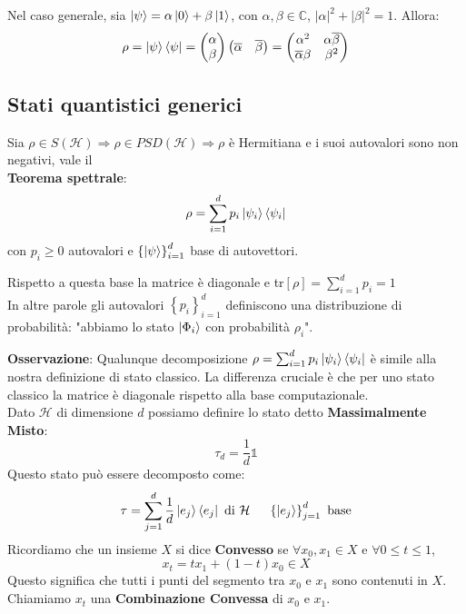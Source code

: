 \documentclass{report}
\begin{document}
Nel caso generale, sia $\ket{\psi}= \alpha\ket{0}+\beta\ket{1}$, con $\alpha, \beta \in \mathbb{C}$, $|\alpha|^2 + |\beta|^2=1$. Allora:
$$\rho= \ket{\psi}\bra{\psi}= 
\begin{pmatrix}
    \alpha \\
    \beta
\end{pmatrix}
\begin{pmatrix}
    \overline{\alpha} & \overline{\beta}
\end{pmatrix}
= \begin{pmatrix}
    \alpha^2 & \alpha\overline{\beta}\\
    \overline{\alpha}\beta & \beta^2
\end{pmatrix}
$$

\subsection{Stati quantistici generici}
Sia $\rho \in S(\mathcal{H}) \Rightarrow \rho \in \textit{PSD}(\mathcal{H}) \Rightarrow \rho$ è Hermitiana e i suoi autovalori sono non negativi, vale il \\\textbf{Teorema spettrale}:
$$\rho = \sum^d_{i=1}p_i \ket{\psi_i}\bra{\psi_i}$$
con $p_i\ge 0$ autovalori e $\left\{ \ket{\psi} \right\}^d_{i=1}$ base di autovettori.

Rispetto a questa base la matrice è diagonale e tr$[\rho] = \sum^d_{i=1} p_i = 1$
\\In altre parole gli autovalori $\left\{  p_i \right\}^d_{i=1}$ definiscono una distribuzione di probabilità: "abbiamo lo stato $\ket{ \Phi_i}$ con probabilità $\rho_i$".

\textbf{Osservazione}: Qualunque decomposizione $\rho = \sum^d_{i=1} p_i \ket{\psi_i}\bra{\psi_i}$ è simile alla nostra definizione di stato classico. La differenza cruciale è che per uno stato classico la matrice è diagonale rispetto alla base computazionale.
\medskip
\\Dato $\mathcal{H}$ di dimensione $d$ possiamo definire lo stato detto \textbf{Massimalmente Misto}: $$\tau_d=\frac{1}{d}\mathbb{1}$$
Questo stato può essere decomposto come:
$$\tau = \sum^d_{j=1} \frac{1}{d} \ket{e_j}\bra{e_j} \text{ di } \mathcal{H} \hspace{0.5cm} \left\{ \ket{e_j} \right\}^d_{j=1} \text{ base}$$
Ricordiamo che un insieme $X$ si dice \textbf{Convesso} se $\forall x_0,x_1 \in X$ e $\forall 0 \le t\le 1$, 
$$x_t = tx_1 + (1-t)x_0 \in X$$
Questo significa che tutti i punti del segmento tra $x_0$ e $x_1$ sono contenuti in $X$. Chiamiamo $x_t$ una \textbf{Combinazione Convessa} di $x_0$ e $x_1$. 
\end{document}
